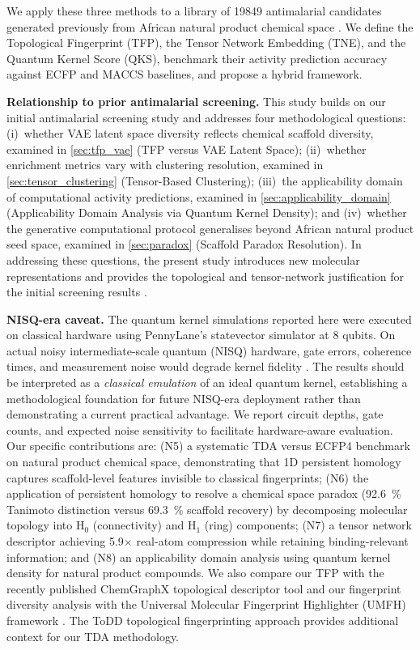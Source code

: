 \documentclass[11pt,a4paper]{article}
\begin{document}
We apply these three methods to a library of \num{19849} antimalarial candidates generated previously from African natural product chemical space \citep{temgoua2026antimalarial}. We define the Topological Fingerprint (TFP), the Tensor Network Embedding (TNE), and the Quantum Kernel Score (QKS), benchmark their activity prediction accuracy against ECFP and MACCS baselines, and propose a hybrid framework.

\noindent\textbf{Relationship to prior antimalarial screening.} This study builds on our initial antimalarial screening study \citep{temgoua2026antimalarial} and addresses four methodological questions: (i)~whether VAE latent space diversity reflects chemical scaffold diversity, examined in \cref{sec:tfp_vae} (TFP versus VAE Latent Space); (ii)~whether enrichment metrics vary with clustering resolution, examined in \cref{sec:tensor_clustering} (Tensor-Based Clustering); (iii)~the applicability domain of computational activity predictions, examined in \cref{sec:applicability_domain} (Applicability Domain Analysis via Quantum Kernel Density); and (iv)~whether the generative computational protocol generalises beyond African natural product seed space, examined in \cref{sec:paradox} (Scaffold Paradox Resolution). In addressing these questions, the present study introduces new molecular representations and provides the topological and tensor-network justification for the initial screening results \citep{temgoua2026antimalarial}.

\noindent\textbf{NISQ-era caveat.} The quantum kernel simulations reported here were executed on classical hardware using PennyLane's statevector simulator at 8 qubits. On actual noisy intermediate-scale quantum (NISQ) hardware, gate errors, coherence times, and measurement noise would degrade kernel fidelity \citep{nature_review_nisq_2024}. The results should be interpreted as a \emph{classical emulation} of an ideal quantum kernel, establishing a methodological foundation for future NISQ-era deployment rather than demonstrating a current practical advantage. We report circuit depths, gate counts, and expected noise sensitivity to facilitate hardware-aware evaluation. Our specific contributions are: (N5) a systematic TDA versus ECFP4 benchmark on natural product chemical space, demonstrating that 1D persistent homology captures scaffold-level features invisible to classical fingerprints; (N6) the application of persistent homology to resolve a chemical space paradox (\qty{92.6}{\percent} Tanimoto distinction versus \qty{69.3}{\percent} scaffold recovery) by decomposing molecular topology into H$_0$ (connectivity) and H$_1$ (ring) components; (N7) a tensor network descriptor achieving \num{5.9}$\times$ real-atom compression while retaining binding-relevant information; and (N8) an applicability domain analysis using quantum kernel density for natural product compounds. We also compare our TFP with the recently published ChemGraphX topological descriptor tool \citep{chemgraphx_2026} and our fingerprint diversity analysis with the Universal Molecular Fingerprint Highlighter (UMFH) framework \citep{umfh_2026}. The ToDD topological fingerprinting approach \citep{todd_2023} provides additional context for our TDA methodology.
\end{document}
